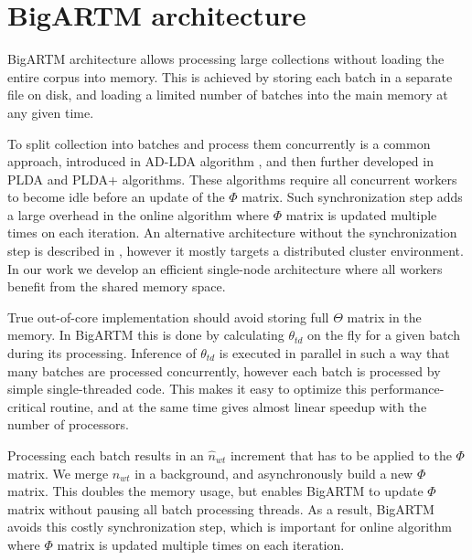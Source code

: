 \documentclass[russian,english]{llncs}
\begin{document}
\section{BigARTM architecture}
\label{sec:BigARTM}

BigARTM architecture allows processing large collections without loading the entire corpus into memory.
This is achieved by storing each batch in a separate file on disk,
and loading a limited number of batches into the main memory at any given time.

To split collection into batches and process them concurrently is a common approach,
introduced in AD-LDA algorithm \cite{newman09distributed}, and
then further developed in PLDA \cite{wang09plda} and PLDA{+} \cite{liu11plda} algorithms.
These algorithms require all concurrent workers to become idle before an update of the $\Phi$ matrix.
Such synchronization step adds a large overhead in the online algorithm where $\Phi$ matrix is updated multiple times on each iteration.
An alternative architecture without the synchronization step is described in \cite{smola10architecture},
however it mostly targets a distributed cluster environment.
In our work we develop an efficient single-node architecture where all workers benefit from the shared memory space.

True out-of-core implementation should avoid storing full $\Theta$ matrix in the memory.
In BigARTM this is done by calculating $\theta_{td}$ on the fly for a given batch during its processing.
Inference of $\theta_{td}$ is executed in parallel in such a way that many batches are processed concurrently,
however each batch is processed by simple single-threaded code.
This makes it easy to optimize this performance-critical routine,
and at the same time gives almost linear speedup with the number of processors.

Processing each batch results in an $\hat n_{wt}$ increment that has to be applied to the $\Phi$ matrix.
We merge $\hat n_{wt}$ in a background, and asynchronously build a new $\Phi$ matrix.
This doubles the memory usage, but enables BigARTM to update $\Phi$ matrix without pausing all batch processing threads.
As a result, BigARTM avoids this costly synchronization step, which is important for online algorithm
where $\Phi$ matrix is updated multiple times on each iteration.
\end{document}
